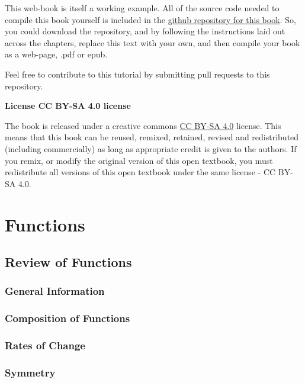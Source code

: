 \documentclass[]{book}
\begin{document}
This web-book is itself a working example. All of the source code needed
to compile this book yourself is included in the
\href{https://github.com/CrumpLab/OER_bookdown}{github repository for
this book}. So, you could download the repository, and by following the
instructions laid out across the chapters, replace this text with your
own, and then compile your book as a web-page, .pdf or epub.

Feel free to contribute to this tutorial by submitting pull requests to
this repository.

\textbf{License CC BY-SA 4.0 license}

The book is released under a creative commons
\href{https://creativecommons.org/licenses/by-sa/4.0/}{CC BY-SA 4.0}
license. This means that this book can be reused, remixed, retained,
revised and redistributed (including commercially) as long as
appropriate credit is given to the authors. If you remix, or modify the
original version of this open textbook, you must redistribute all
versions of this open textbook under the same license - CC BY-SA 4.0.

\chapter{Functions}\label{functions}

\section{Review of Functions}\label{review-of-functions}

\subsection{General Information}\label{general-information}

\subsection{Composition of Functions}\label{composition-of-functions}

\subsection{Rates of Change}\label{rates-of-change}

\subsection{Symmetry}\label{symmetry}
\end{document}
